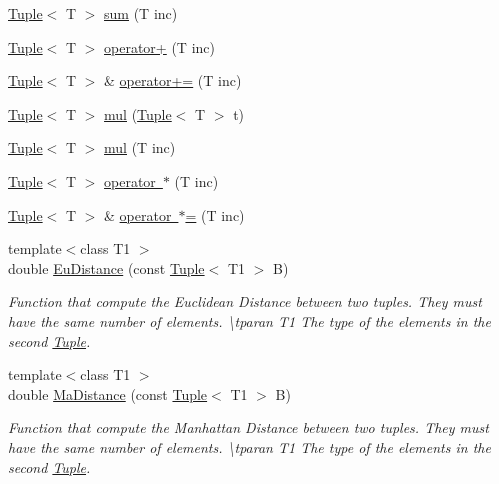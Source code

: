 \begin{DoxyCompactItemize}
\item 
\mbox{\hyperlink{class_tuple}{Tuple}}$<$ T $>$ \mbox{\hyperlink{class_tuple_a20daa0804e2bac28949b5abe0cbcc589}{sum}} (T inc)
\item 
\mbox{\hyperlink{class_tuple}{Tuple}}$<$ T $>$ \mbox{\hyperlink{class_tuple_af41b573429ba5d8fc0b5576b7b41e818}{operator+}} (T inc)
\item 
\mbox{\hyperlink{class_tuple}{Tuple}}$<$ T $>$ \& \mbox{\hyperlink{class_tuple_aeace0f594f48529ddf3385cb2f023daf}{operator+=}} (T inc)
\item 
\mbox{\hyperlink{class_tuple}{Tuple}}$<$ T $>$ \mbox{\hyperlink{class_tuple_aa04cadf68dd3658943db047b6fd500fa}{mul}} (\mbox{\hyperlink{class_tuple}{Tuple}}$<$ T $>$ t)
\item 
\mbox{\hyperlink{class_tuple}{Tuple}}$<$ T $>$ \mbox{\hyperlink{class_tuple_ad1de2e1ba86734fb751897138707a603}{mul}} (T inc)
\item 
\mbox{\hyperlink{class_tuple}{Tuple}}$<$ T $>$ \mbox{\hyperlink{class_tuple_ab5bd095731feb7aa39bcf41778eb144f}{operator $\ast$}} (T inc)
\item 
\mbox{\hyperlink{class_tuple}{Tuple}}$<$ T $>$ \& \mbox{\hyperlink{class_tuple_a5dfd14ef6f956b608d6a99bdf0cf9c75}{operator $\ast$=}} (T inc)
\item 
{\footnotesize template$<$class T1 $>$ }\\double \mbox{\hyperlink{class_tuple_a973d6cae203bca0c1ce0d0b65279e433}{Eu\+Distance}} (const \mbox{\hyperlink{class_tuple}{Tuple}}$<$ T1 $>$ B)
\begin{DoxyCompactList}\small\item\em Function that compute the Euclidean Distance between two tuples. They must have the same number of elements. \textbackslash{}tparan T1 The type of the elements in the second \mbox{\hyperlink{class_tuple}{Tuple}}. \end{DoxyCompactList}\item 
{\footnotesize template$<$class T1 $>$ }\\double \mbox{\hyperlink{class_tuple_ac668269743d9be71769c9b4a424c785f}{Ma\+Distance}} (const \mbox{\hyperlink{class_tuple}{Tuple}}$<$ T1 $>$ B)
\begin{DoxyCompactList}\small\item\em Function that compute the Manhattan Distance between two tuples. They must have the same number of elements. \textbackslash{}tparan T1 The type of the elements in the second \mbox{\hyperlink{class_tuple}{Tuple}}. \end{DoxyCompactList}\item 

\end{DoxyCompactItemize}
